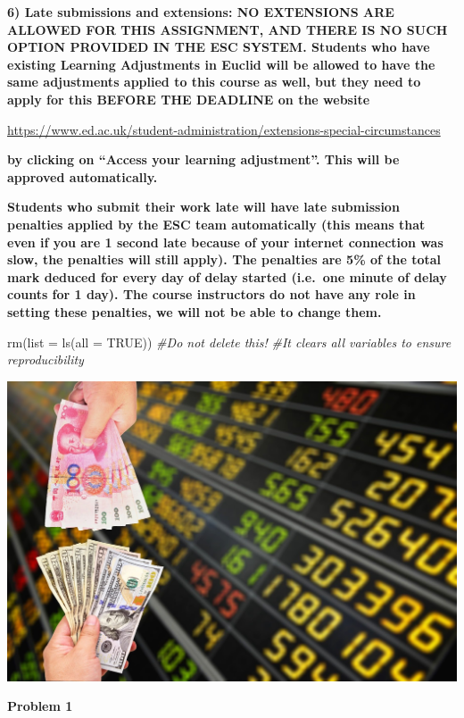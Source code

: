 \documentclass[
]{article}
\newenvironment{Shaded}{\begin{snugshade}}{\end{snugshade}}
\newcommand{\AttributeTok}[1]{\textcolor[rgb]{0.77,0.63,0.00}{#1}}
\newcommand{\CommentTok}[1]{\textcolor[rgb]{0.56,0.35,0.01}{\textit{#1}}}
\newcommand{\ConstantTok}[1]{\textcolor[rgb]{0.00,0.00,0.00}{#1}}
\newcommand{\FunctionTok}[1]{\textcolor[rgb]{0.00,0.00,0.00}{#1}}
\newcommand{\NormalTok}[1]{#1}
\begin{document}
\textbf{6) Late submissions and extensions: NO EXTENSIONS ARE ALLOWED
FOR THIS ASSIGNMENT, AND THERE IS NO SUCH OPTION PROVIDED IN THE ESC
SYSTEM. Students who have existing Learning Adjustments in Euclid will
be allowed to have the same adjustments applied to this course as well,
but they need to apply for this BEFORE THE DEADLINE on the website}

\url{https://www.ed.ac.uk/student-administration/extensions-special-circumstances}

\textbf{by clicking on ``Access your learning adjustment''. This will be
approved automatically.}

\textbf{Students who submit their work late will have late submission
penalties applied by the ESC team automatically (this means that even if
you are 1 second late because of your internet connection was slow, the
penalties will still apply). The penalties are 5\% of the total mark
deduced for every day of delay started (i.e.~one minute of delay counts
for 1 day). The course instructors do not have any role in setting these
penalties, we will not be able to change them.}

\begin{Shaded}
\begin{Highlighting}[]
\FunctionTok{rm}\NormalTok{(}\AttributeTok{list =} \FunctionTok{ls}\NormalTok{(}\AttributeTok{all =} \ConstantTok{TRUE}\NormalTok{))}
\CommentTok{\#Do not delete this!}
\CommentTok{\#It clears all variables to ensure reproducibility}
\end{Highlighting}
\end{Shaded}

\includegraphics{Exchange-rate.jpg}

\textbf{Problem 1}
\end{document}
